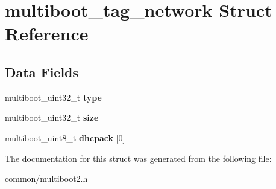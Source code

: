 \hypertarget{structmultiboot__tag__network}{}\section{multiboot\+\_\+tag\+\_\+network Struct Reference}
\label{structmultiboot__tag__network}
\subsection*{Data Fields}
\begin{DoxyCompactItemize}
\item 
multiboot\+\_\+uint32\+\_\+t {\bfseries type}\hypertarget{structmultiboot__tag__network_a0b4b7423e6f13e364cd1b40d4c251a22}{}\label{structmultiboot__tag__network_a0b4b7423e6f13e364cd1b40d4c251a22}

\item 
multiboot\+\_\+uint32\+\_\+t {\bfseries size}\hypertarget{structmultiboot__tag__network_ac53d6a8f9d07d3fc09b7f6cb29b00a72}{}\label{structmultiboot__tag__network_ac53d6a8f9d07d3fc09b7f6cb29b00a72}

\item 
multiboot\+\_\+uint8\+\_\+t {\bfseries dhcpack} \mbox{[}0\mbox{]}\hypertarget{structmultiboot__tag__network_aade2dff510f8e32b462ec1037437d28c}{}\label{structmultiboot__tag__network_aade2dff510f8e32b462ec1037437d28c}

\end{DoxyCompactItemize}


The documentation for this struct was generated from the following file\+:\begin{DoxyCompactItemize}
\item 
common/multiboot2.\+h\end{DoxyCompactItemize}
